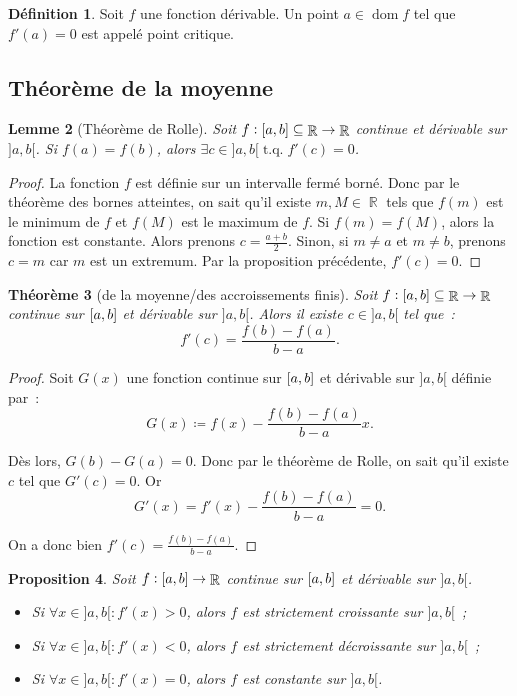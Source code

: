 \documentclass{article}
\DeclareMathOperator{\dom}{dom}
\DeclareMathOperator{\R}{\mathbb R}
\DeclareMathOperator{\tq}{ t.q. }
\newcommand{\ab}{\interval ab}
\newcommand{\fabr}[1]{#1 : \ab \to \R}
\newtheorem{thm}{Théorème}[section]
\newtheorem{prp}[thm]{Proposition}
\newtheorem{lem}[thm]{Lemme}
\theoremstyle{definition}
\newtheorem{déf}[thm]{Définition}
\theoremstyle{remark}
\begin{document}
		\begin{déf} Soit $f$ une fonction dérivable. Un point $a \in \dom f$ tel que $f'(a) = 0$ est appelé point critique. \end{déf}

	\subsection{Théorème de la moyenne}

		\begin{lem}[Théorème de Rolle] Soit $f : \ab \subseteq \R \to \R$ continue et dérivable sur $]a, b[$. Si $f(a) = f(b)$, alors
		$\exists c \in ]a, b[ \tq f'(c) = 0$. \end{lem}

		\begin{proof} La fonction $f$ est définie sur un intervalle fermé borné. Donc par le théorème des bornes atteintes, on sait qu'il existe $m, M \in \R$
		tels que $f(m)$ est le minimum de $f$ et $f(M)$ est le maximum de $f$. Si $f(m) = f(M)$, alors la fonction est constante. Alors prenons $c = \frac {a+b}2$.
		Sinon, si $m \neq a$ et $m \neq b$, prenons $c = m$ car $m$ est un extremum. Par la proposition précédente, $f'(c) = 0$. \end{proof}

		\begin{thm}[de la moyenne/des accroissements finis] Soit $f : \ab \subseteq \R \to \R$ continue sur $\ab$ et dérivable sur $]a, b[$.
		Alors il existe $c \in ]a, b[$ tel que~:
		\[f'(c) = \frac {f(b)-f(a)}{b-a}.\]
		\end{thm}

		\begin{proof} Soit $G(x)$ une fonction continue sur $\ab$ et dérivable sur $]a, b[$ définie par~:
		\[G(x) \coloneqq f(x) - \frac {f(b)-f(a)}{b-a}x.\]

		Dès lors, $G(b)-G(a)=0$. Donc par le théorème de Rolle, on sait qu'il existe $c$ tel que $G'(c) = 0$. Or
		\[G'(x) = f'(x) - \frac {f(b)-f(a)}{b-a} = 0.\]

		On a donc bien $f'(c) = \frac {f(b)-f(a)}{b-a}$. \end{proof}

		\begin{prp} Soit $\fabr f$ continue sur $\ab$ et dérivable sur $]a, b[$.

		\begin{itemize}
			\item[$(i)$]   Si $\forall x \in ]a, b[ : f'(x) > 0$, alors $f$ est strictement croissante  sur $]a, b[$~;
			\item[$(ii)$]  Si $\forall x \in ]a, b[ : f'(x) < 0$, alors $f$ est strictement décroissante sur $]a, b[$~;
			\item[$(iii)$] Si $\forall x \in ]a, b[ : f'(x) = 0$, alors $f$ est constante sur $]a, b[$.
		\end{itemize}
		\end{prp}
\end{document}

